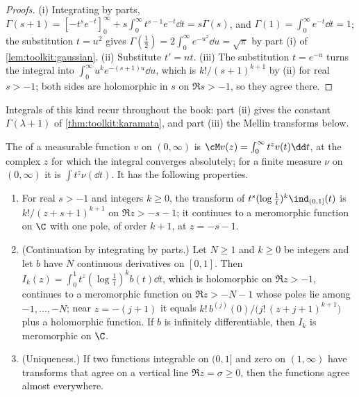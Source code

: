 \begin{refsection}
\begin{proof}[Proofs]
(i) Integrating by parts, $\Gamma(s+1)=[-t^se^{-t}]_0^\infty+s\int_0^\infty t^{s-1}e^{-t}\dd t=s\Gamma(s)$, and $\Gamma(1)=\int_0^\infty e^{-t}\dd t=1$; the substitution $t=u^2$ gives $\Gamma(\frac12)=2\int_0^\infty e^{-u^2}\dd u=\sqrt\pi$ by part (i) of \cref{lem:toolkit:gaussian}. (ii) Substitute $t'=nt$. (iii) The substitution $t=e^{-u}$ turns the integral into $\int_0^\infty u^ke^{-(s+1)u}\dd u$, which is $k!/(s+1)^{k+1}$ by (ii) for real $s>-1$; both sides are holomorphic in $s$ on $\Re s>-1$, so they agree there.
\end{proof}

Integrals of this kind recur throughout the book: part (ii) gives the constant $\Gamma(\lambda+1)$ of \cref{thm:toolkit:karamata}, and part (iii) the Mellin transforms below.

\begin{definition}\label{def:toolkit:mellin}
The  of a measurable function $v$ on $(0,\infty)$ is $\cM v(z)=\int_0^\infty t^zv(t)\dd t$, at the complex $z$ for which the integral converges absolutely; for a finite measure $\nu$ on $(0,\infty)$ it is $\int t^z\nu(\dd t)$. It has the following properties.
\begin{enumerate}
\item For real $s>-1$ and integers $k\ge0$, the transform of $t^s(\log\frac1t)^k\ind_{(0,1]}(t)$ is $k!/(z+s+1)^{k+1}$ on $\Re z>-s-1$; it continues to a meromorphic function on $\C$ with one pole, of order $k+1$, at $z=-s-1$.
\item (Continuation by integrating by parts.) Let $N\ge1$ and $k\ge0$ be integers and let $b$ have $N$ continuous derivatives on $[0,1]$. Then $I_k(z)=\int_0^1t^z(\log\frac1t)^kb(t)\dd t$, which is holomorphic on $\Re z>-1$, continues to a meromorphic function on $\Re z>-N-1$ whose poles lie among $-1,\dots,-N$; near $z=-(j+1)$ it equals $k!\,b^{(j)}(0)/\bigl(j!\,(z+j+1)^{k+1}\bigr)$ plus a holomorphic function. If $b$ is infinitely differentiable, then $I_k$ is meromorphic on $\C$.
\item (Uniqueness.) If two functions integrable on $(0,1]$ and zero on $(1,\infty)$ have transforms that agree on a vertical line $\Re z=\sigma\ge0$, then the functions agree almost everywhere.
\end{enumerate}
\end{definition}


\end{refsection}
